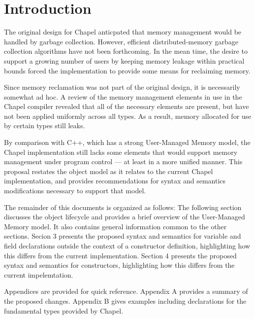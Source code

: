 \section{Introduction}

The original design for Chapel anticpated that memory management would be handled
by garbage collection.  However, efficient distributed-memory garbage collection
algorithms have not been forthcoming.  In the mean time, the desire to support a growing
number of users by keeping memory leakage within practical bounds forced the
implementation to provide some means for reclaiming memory.  

Since memory reclamation was not part of the original design, it is necessarily somewhat
ad hoc.  A review of the memory management elements in use in the Chapel compiler revealed
that all of the necessary elements are present, but have not been applied uniformly across
all types.  As a result, memory allocated for use by certain types still leaks.

By comparison with C++, which has a strong User-Managed Memory model, the Chapel
implementation still lacks some elements that would support memory management under
program control --- at least in a more unified manner.  This proposal restates the object
model as it relates to the current Chapel implementation, and provides recommendations for
syntax and semantics modifications necessary to support that model.

The remainder of this documents is organized as follows: The following section discusses
the object lifecycle and provides a brief overview of the User-Managed Memory model.  It
also contains general information common to the other sections.  Secion 3 presents the proposed
syntax and semantics for variable and field declarations outside the context of a
constructor definition, highlighting how this differs from the current implementation.
Section 4 presents the proposed syntax and semantics for constructors, highlighting how
this differs from the current impelemtation.

Appendices are provided for quick reference.  Appendix A provides a summary of the
proposed changes.  Appendix B gives examples including declarations for the fundamental
types provided by Chapel.

